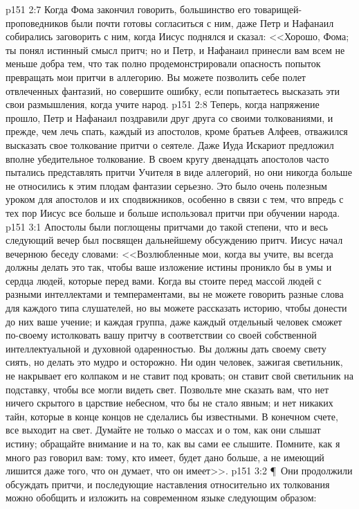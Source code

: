 \vs p151 2:7 Когда Фома закончил говорить, большинство его товарищей\hyp{}проповедников были почти готовы согласиться с ним, даже Петр и Нафанаил собирались заговорить с ним, когда Иисус поднялся и сказал: <<Хорошо, Фома; ты понял истинный смысл притч; но и Петр, и Нафанаил принесли вам всем не меньше добра тем, что так полно продемонстрировали опасность попыток превращать мои притчи в аллегорию. Вы можете позволить себе полет отвлеченных фантазий, но совершите ошибку, если попытаетесь высказать эти свои размышления, когда учите народ.
\vs p151 2:8 Теперь, когда напряжение прошло, Петр и Нафанаил поздравили друг друга со своими толкованиями, и прежде, чем лечь спать, каждый из апостолов, кроме братьев Алфеев, отважился высказать свое толкование притчи о сеятеле. Даже Иуда Искариот предложил вполне убедительное толкование. В своем кругу двенадцать апостолов часто пытались представлять притчи Учителя в виде аллегорий, но они никогда больше не относились к этим плодам фантазии серьезно. Это было очень полезным уроком для апостолов и их сподвижников, особенно в связи с тем, что впредь с тех пор Иисус все больше и больше использовал притчи при обучении народа.
\vs p151 3:1 Апостолы были поглощены притчами до такой степени, что и весь следующий вечер был посвящен дальнейшему обсуждению притч. Иисус начал вечернюю беседу словами: <<Возлюбленные мои, когда вы учите, вы всегда должны делать это так, чтобы ваше изложение истины проникло бы в умы и сердца людей, которые перед вами. Когда вы стоите перед массой людей с разными интеллектами и темпераментами, вы не можете говорить разные слова для каждого типа слушателей, но вы можете рассказать историю, чтобы донести до них ваше учение; и каждая группа, даже каждый отдельный человек сможет по\hyp{}своему истолковать вашу притчу в соответствии со своей собственной интеллектуальной и духовной одаренностью. Вы должны дать своему свету сиять, но делать это мудро и осторожно. Ни один человек, зажигая светильник, не накрывает его колпаком и не ставит под кровать; он ставит свой светильник на подставку, чтобы все могли видеть свет. Позвольте мне сказать вам, что нет ничего скрытого в царствие небесном, что бы не стало явным; и нет никаких тайн, которые в конце концов не сделались бы известными. В конечном счете, все выходит на свет. Думайте не только о массах и о том, как они слышат истину; обращайте внимание и на то, как вы сами ее слышите. Помните, как я много раз говорил вам: тому, кто имеет, будет дано больше, а не имеющий лишится даже того, что он думает, что он имеет>>.
\vs p151 3:2 \P\ Они продолжили обсуждать притчи, и последующие наставления относительно их толкования можно обобщить и изложить на современном языке следующим образом:
